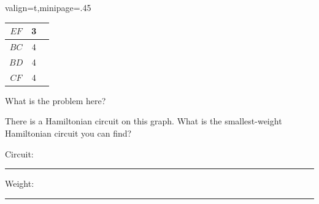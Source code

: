 \documentclass[12pt]{article}
\newcommand{\ans}[1][1in]{\rule{#1}{.5pt}}
\begin{document}
\begin{center}
\begin{adjustbox}{valign=t,minipage={.45\textwidth}}
\begin{tabular}{ c | c | c }
$EF$ & 3 & \\ \hline
$BC$ & 4& \\ \hline
$BD$ & 4& \\ \hline
$CF$ & 4&\\ \hline

\end{tabular}
 \end{adjustbox}
 \hfill

\end{center}

What is the problem here? 
\vfill

There is a Hamiltonian circuit on this graph. What is the smallest-weight Hamiltonian circuit you can find? 

\vfill

Circuit: \ans[3in] Weight: \ans

\bigskip
\end{document}
